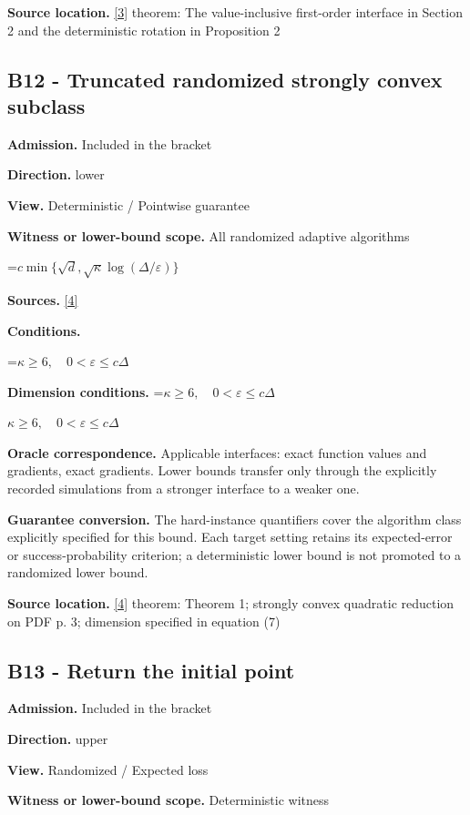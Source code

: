 \documentclass[10pt,a4paper]{article}
\newcommand{\AtlasMath}[1]{\par\begingroup\centering\setbox0=\hbox{$\displaystyle #1$}\ifdim\wd0>1.4\linewidth\typeout{ATLAS WIDE FORMULA: \the\wd0}\fi\ifdim\wd0>\linewidth\resizebox{\linewidth}{!}{\box0}\else\box0\fi\par\endgroup}
\newcommand{\AtlasInlineMath}[1]{\begingroup\setbox0=\hbox{$#1$}\ifdim\wd0>.4\linewidth\endgroup\AtlasMath{#1}\else\endgroup$#1$\fi}
\begin{document}
\textbf{Source location.} \href{https://arxiv.org/pdf/1710.11606}{[3]} theorem: The value-inclusive first-order interface in Section 2 and the deterministic rotation in Proposition 2

\subsection{B12 - Truncated randomized strongly convex subclass}
\textbf{Admission.} Included in the bracket

\textbf{Direction.} lower

\textbf{View.} Deterministic / Pointwise guarantee

\textbf{Witness or lower-bound scope.} All randomized adaptive algorithms

\AtlasMath{c\min\{\sqrt d,\sqrt\kappa\log(\Delta/\varepsilon)\}}
\textbf{Sources.} \href{https://arxiv.org/pdf/2609.10874}{[4]}

\textbf{Conditions.} 
\AtlasMath{\kappa\ge6,\quad0<\varepsilon\le c\Delta}


\textbf{Dimension conditions.} \AtlasInlineMath{\kappa\ge6,\quad0<\varepsilon\le c\Delta}

\textbf{Oracle correspondence.} Applicable interfaces: exact function values and gradients, exact gradients. Lower bounds transfer only through the explicitly recorded simulations from a stronger interface to a weaker one.

\textbf{Guarantee conversion.} The hard-instance quantifiers cover the algorithm class explicitly specified for this bound. Each target setting retains its expected-error or success-probability criterion; a deterministic lower bound is not promoted to a randomized lower bound.

\textbf{Source location.} \href{https://arxiv.org/pdf/2609.10874}{[4]} theorem: Theorem 1; strongly convex quadratic reduction on PDF p. 3; dimension specified in equation (7)

\subsection{B13 - Return the initial point}
\textbf{Admission.} Included in the bracket

\textbf{Direction.} upper

\textbf{View.} Randomized / Expected loss

\textbf{Witness or lower-bound scope.} Deterministic witness
\end{document}
